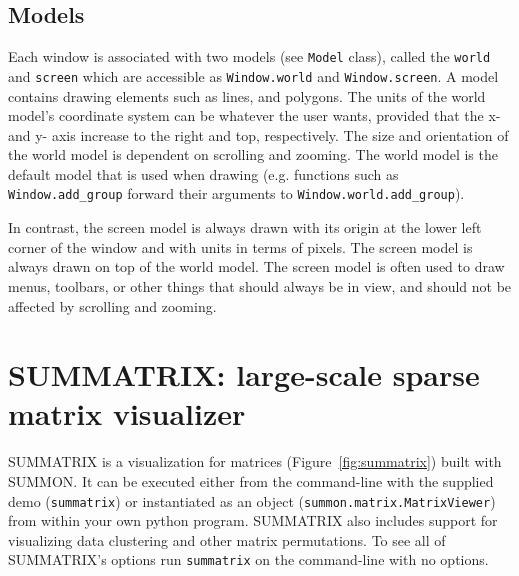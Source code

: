 \documentclass[12pt]{article}
\newcommand{\code}[1]{{\tt #1}}
\newcommand{\figref}[1]{Figure~\ref{#1}}
\begin{document}
\subsection{Models}

Each window is associated with two models (see \code{Model} class), called the
\code{world} and \code{screen} which are accessible as \code{Window.world} and
\code{Window.screen}.  A model contains drawing elements such as lines, and
polygons.  The units of the world model's coordinate system  can
be whatever the user wants, provided that the x- and y- axis increase to 
the right and top, respectively.   The size and orientation of the world 
model is dependent on scrolling and zooming. The world model is the
default model that is  used when drawing (e.g. functions such as
\code{Window.add\_group} forward their arguments to 
\code{Window.world.add\_group}).

In contrast, the screen model is always drawn with its origin at the 
lower left corner of the window and with units in terms of pixels. The
screen model is always drawn on top of the world model.  The screen model
is often used to draw menus, toolbars, or other things that should always
be in view, and should not be affected by scrolling and zooming.

\section{SUMMATRIX: large-scale sparse matrix visualizer}

SUMMATRIX is a visualization for matrices (\figref{fig:summatrix}) built with
SUMMON.  It can be executed either from the command-line with the supplied demo
(\code{summatrix}) or  instantiated as an object
(\code{summon.matrix.MatrixViewer}) from within your own python program. 
SUMMATRIX also includes support for visualizing data clustering and other
matrix permutations.  To see all of SUMMATRIX's options run \code{summatrix} on
the command-line with no options.
\end{document}
